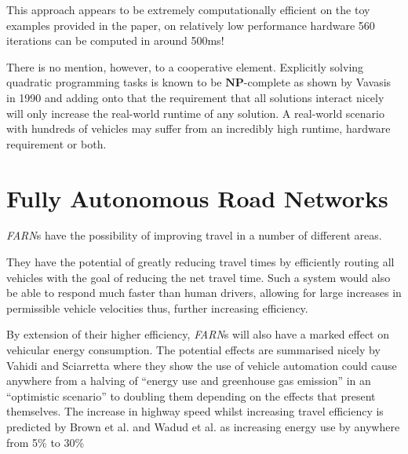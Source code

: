 This approach appears to be extremely computationally efficient on the toy examples provided in the paper, on relatively low performance hardware 560 iterations can be computed in around 500ms!

There is no mention, however, to a cooperative element. Explicitly solving quadratic programming tasks is known to be $\mathbf{NP}$-complete as shown by Vavasis in 1990\cite{VAVASIS199073} and adding onto that the requirement that all solutions interact nicely will only increase the real-world runtime of any solution. A real-world scenario with hundreds of vehicles may suffer from an incredibly high runtime, hardware requirement or both.

\section{Fully Autonomous Road Networks}

\textit{FARN}s have the possibility of improving travel in a number of different areas. 

They have the potential of greatly reducing travel times by efficiently routing all vehicles with the goal of reducing the net travel time. Such a system would also be able to respond much faster than human drivers, allowing for large increases in permissible vehicle velocities thus, further increasing efficiency.

By extension of their higher efficiency, \textit{FARN}s will also have a marked effect on vehicular energy consumption. The potential effects are summarised nicely by Vahidi and Sciarretta\cite{vahidiEnergySavingPotentials2018} where they show the use of vehicle automation could cause anywhere from a halving of ``energy use and greenhouse gas emission'' in an ``optimistic scenario'' to doubling them depending on the effects that present themselves. The increase in highway speed whilst increasing travel efficiency is predicted by Brown et al.\cite{brownAnalysisPossibleEnergy2014} and Wadud et al.\cite{wadudHelpHindranceTravel2016} as increasing energy use by anywhere from 5\% to 30\%


